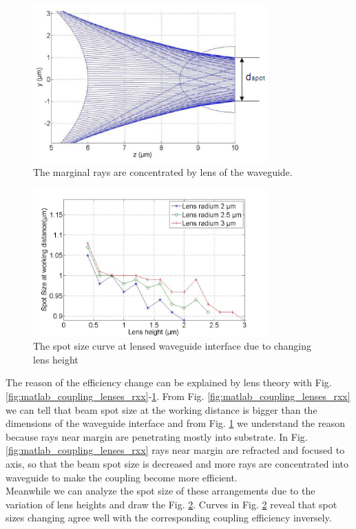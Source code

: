 \begin{figure}[!ht]
\centering
\includegraphics[width=0.8\textwidth]{bilder/beam_ray_refract}
\caption{The marginal rays are concentrated by lens of the waveguide.}
\label{fig:matlab_coupling_lenses_rxx2}
\end{figure}
\begin{figure}[!ht]
\centering
\includegraphics[width=0.8\textwidth]{bilder/spot_fix_lens_radium_hxx}
\caption{The spot size curve at lensed waveguide interface due to changing lens height}
\label{fig:lensed_guide_spot_size_curve}
\end{figure}
The reason of the efficiency change can be explained by lens theory with Fig.  \ref{fig:matlab_coupling_lenses_rxx}-\ref{fig:matlab_coupling_lenses_rxx2}. From Fig. \ref{fig:matlab_coupling_lenses_rxx} we can tell that beam spot size at the working distance is bigger than the dimensions of the waveguide interface and from Fig. \ref{fig:matlab_coupling_lenses_rxx2} we understand the reason because rays near margin are penetrating mostly into substrate. In Fig. \ref{fig:matlab_coupling_lenses_rxx} rays near margin are refracted and focused to axis, so that the beam spot size is decreased and more rays are concentrated into waveguide to make the coupling become more efficient.\\   
Meanwhile we can analyze the spot size of these arrangements due to the variation of lens heights and draw the Fig. \ref{fig:lensed_guide_spot_size_curve}. Curves in Fig. \ref{fig:lensed_guide_spot_size_curve} reveal that spot sizes changing agree well with the corresponding coupling efficiency inversely.

